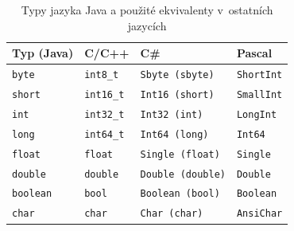 \documentclass[czech,BP]{thesiskiv}
\begin{document}
\begin{table}\centering
\caption{Typy jazyka Java a použité ekvivalenty v~ostatních jazycích}
\begin{tabular}{| l | l | l | l |}
\hline
\textbf{Typ (Java)} & \textbf{C/C++} & \textbf{C\#} & \textbf{Pascal} \\ \hline
\texttt{byte} & \texttt{int8\_t} & \texttt{Sbyte (sbyte)} & \texttt{ShortInt} \\ \hline
\texttt{short} & \texttt{int16\_t} & \texttt{Int16 (short)} & \texttt{SmallInt} \\ \hline
\texttt{int} & \texttt{int32\_t} & \texttt{Int32 (int)} & \texttt{LongInt} \\ \hline
\texttt{long} & \texttt{int64\_t} & \texttt{Int64 (long)} & \texttt{Int64} \\ \hline
\texttt{float} & \texttt{float} & \texttt{Single (float)} & \texttt{Single} \\ \hline
\texttt{double} & \texttt{double} & \texttt{Double (double)} & \texttt{Double} \\ \hline
\texttt{boolean} & \texttt{bool} & \texttt{Boolean (bool)} & \texttt{Boolean} \\ \hline
\texttt{char} & \texttt{char} & \texttt{Char (char)} & \texttt{AnsiChar} \\ \hline
\end{tabular}
\label{table:types-summary}
\end{table}
\end{document}
